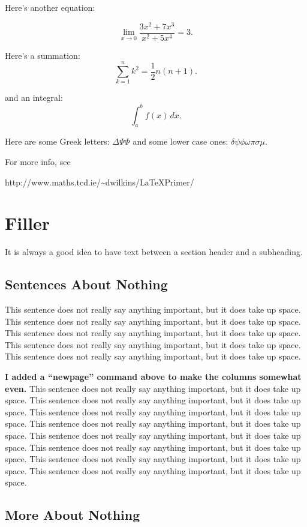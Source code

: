 \documentclass[a4paper, conference]{IEEEconf}
\begin{document}
Here's another equation:

\[ \lim_{x \to 0} \frac{3x^2 +7x^3}{x^2 +5x^4} = 3.\]

Here's a summation:
\[ \sum_{k=1}^n k^2 = \frac{1}{2} n (n+1).\] 

and an integral:
\[ \int_a^b f(x)\,dx.\]

Here are some Greek letters:
$ \Delta \Psi \Phi $
and some lower case ones:
$ \delta \psi \phi \omega \pi \sigma \mu $.

For more info, see


http://www.maths.tcd.ie/\~{}dwilkins/LaTeXPrimer/

\section{Filler}

It is always a good idea to have text between a section header and
a subheading.

\subsection{Sentences About Nothing}

This sentence does not really say anything important, but it does take up space.
This sentence does not really say anything important, but it does take up space.
This sentence does not really say anything important, but it does take up space.
This sentence does not really say anything important, but it does take up space.
This sentence does not really say anything important, but it does take up space.

\newpage

{\bf I added a ``newpage'' command above to make the columns somewhat even.}
This sentence does not really say anything important, but it does take up space.
This sentence does not really say anything important, but it does take up space.
This sentence does not really say anything important, but it does take up space.
This sentence does not really say anything important, but it does take up space.
This sentence does not really say anything important, but it does take up space.
This sentence does not really say anything important, but it does take up space.
This sentence does not really say anything important, but it does take up space.
This sentence does not really say anything important, but it does take up space.


\subsection{More About Nothing}
\end{document}
